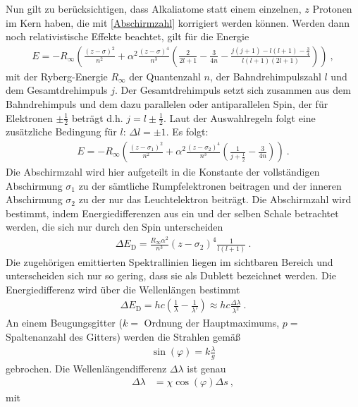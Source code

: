 Nun gilt zu berücksichtigen, dass Alkaliatome statt einem einzelnen, $z$ Protonen im Kern haben, die mit \eqref{Abschirmzahl} korrigiert werden können. Werden dann noch relativistische Effekte beachtet, gilt für die Energie \begin{align}
	E = - R_\infty \left( \frac{(z-\sigma)^2}{n^2} + \alpha^2 \frac{(z-\sigma)^4}{n^3}\left(\frac{2}{2 l + 1}  - \frac{3}{4n}  - \frac{j(j+1) - l(l+1)-\frac{3}{4}}{l(l+1)(2l+1) }\right) \right) \ ,
\end{align}
mit der Ryberg-Energie $R_\infty$ der Quantenzahl $n$, der Bahndrehimpulszahl $l$ und dem Gesamtdrehimpuls $j$. Der Gesamtdrehimpuls setzt sich zusammen aus dem Bahndrehimpuls und dem dazu parallelen oder antiparallelen Spin, der für Elektronen $\pm\frac{1}{2}$ beträgt d.h. $j = l \pm \frac{1}{2}$. Laut der Auswahlregeln folgt eine zusätzliche Bedingung für $l$: $\Delta l = \pm 1$.
Es folgt:
\begin{align}
	E = - R_\infty \left( \frac{(z-\sigma_1)^2}{n^2} + \alpha^2 \frac{(z-\sigma_2)^4}{n^3}\left(\frac{1}{j+\frac{1}{2}}  - \frac{3}{4n}\right) \right) \ .
\end{align}
Die Abschirmzahl wird hier aufgeteilt in die Konstante der  vollständigen Abschirmung $\sigma_1$ zu der sämtliche Rumpfelektronen beitragen und der inneren Abschirmung $\sigma_2$ zu der nur das Leuchtelektron beiträgt. Die Abschirmzahl wird bestimmt, indem Energiedifferenzen aus ein und der selben Schale betrachtet werden, die sich nur durch den Spin unterscheiden
\begin{align}\label{Abschirm}
	\Delta E_\text{D} = \frac{R_\infty\alpha^2}{n^3}(z-\sigma_2)^4\frac{1}{l(l+1)} \ .
\end{align}
Die zugehörigen emittierten Spektrallinien liegen im sichtbaren Bereich und unterscheiden sich nur so gering, dass sie als Dublett bezeichnet werden. Die Energiedifferenz wird über die Wellenlängen bestimmt
\begin{align}\label{DeltaE}
	\Delta E_\text{D} = hc\left(\frac{1}{\lambda}-\frac{1}{\lambda'}\right) \approx hc\frac{\Delta \lambda}{\lambda^2} \ .
\end{align}
An einem Beugungsgitter ($k =$ Ordnung der Hauptmaximums, $p =$ Spaltenanzahl des Gitters) werden die Strahlen gemäß
\begin{align}\label{Gitterkonstante}
	\sin(\varphi) = k\frac{\lambda}{g}
\end{align}
gebrochen.
Die Wellenlängendifferenz $\Delta \lambda$ ist genau
\begin{align}\label{DeltaLambda}
	\Delta \lambda &= \chi \cos(\varphi)\Delta s \ ,
\end{align}	
mit

